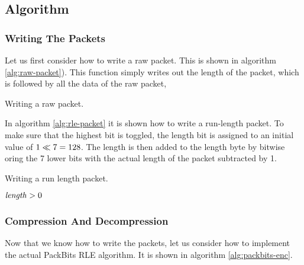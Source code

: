\subsection{Algorithm}

\subsubsection{Writing The Packets}

Let us first consider how to write a raw packet. This is shown in
algorithm \ref{alg:raw-packet}). This function simply writes out the
length of the packet, which is followed by all the data of the raw
packet,

\begin{algorithm}
  \caption{Writing a raw packet.}
  \label{alg:raw-packet}
  \begin{algorithmic}[1]
    \State {}
    \State {}
    \EndForEach
    \EndFunction
  \end{algorithmic}
\end{algorithm}

In algorithm \ref{alg:rle-packet} it is shown how to write a
run-length packet. To make sure that the highest bit is toggled, the
length bit is assigned to an initial value of $1 \ll 7 =
128$. The length is then added to the length byte by bitwise oring the
7 lower bits with the actual length of the packet subtracted by 1.

\begin{algorithm}
  \caption{Writing a run length packet.}
  \label{alg:rle-packet}
  \begin{algorithmic}[1]
    \Require $\mathit{length} > 0$
    \State {}
    \State {}
    \EndFunction
  \end{algorithmic}
\end{algorithm}

\subsubsection{Compression And Decompression}
\label{sec:compr-decompr}

Now that we know how to write the packets, let us consider how to
implement the actual PackBits RLE algorithm. It is shown in algorithm
\ref{alg:packbits-enc}.

